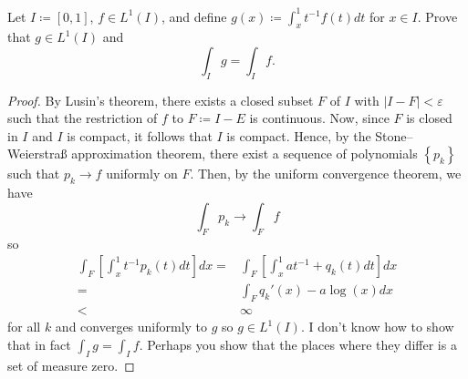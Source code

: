 \begin{problem}
Let $I\coloneqq[0,1]$, $f\in L^1(I)$, and define $g(x)\coloneqq\int_x^1
t^{-1}f(t) d  t$ for $x\in I$. Prove that $g\in L^1(I)$ and
\[
\int_I g=\int_I f.
\]
\end{problem}
\begin{proof}
By Lusin's theorem, there exists a closed subset $F$ of $I$ with $|I\minus
F|<\varepsilon$ such that the restriction of $f$ to $F\coloneqq I\minus E$
is continuous. Now, since $F$ is closed in $I$ and $I$ is compact, it
follows that $I$ is compact. Hence, by the Stone--Weierstraß approximation
theorem, there exist a sequence of polynomials $\left\{ p_k \right\}$ such
that $p_k\to f$ uniformly on $F$. Then, by the uniform convergence theorem,
we have
\begin{equation}
  \label{eq:uniform-convergence-2-4}
\int_F p_k\longrightarrow \int_F f
\end{equation}
so
\begin{equation}
  \label{eq:uniform-convergence-2-2-4}
\begin{aligned}
\int_F\left[\int_x^1t^{-1}p_k(t) d  t\right] d  x
={}&\int_F\left[\int_x^1 at^{-1}+q_k(t) d  t\right] d  x\\
={}&\int_F q_k'(x)-a\log(x) d  x\\
<{}&\infty
\end{aligned}
\end{equation}
for all $k$ and converges uniformly to $g$ so $g\in L^1(I)$. I don't know
how to show that in fact $\int_I g=\int_I f$. Perhaps you show that the
places where they differ is a set of measure zero.
\end{proof}

